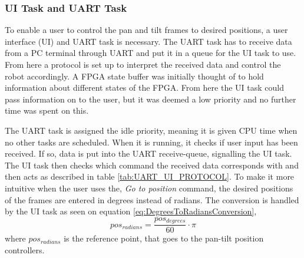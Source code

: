 \documentclass[../../main.tex]{subfiles}
\begin{document}





\subsubsection*{UI Task and UART Task}

To enable a user to control the pan and tilt frames to desired positions, a user interface (UI) and UART task is necessary. The UART task has to receive data from a PC terminal through UART and put it in a queue for the UI task to use. From here a protocol is set up to interpret the received data and control the robot accordingly. A FPGA state buffer was initially thought of to hold information about different states of the FPGA. From here the UI task could pass information on to the user, but it was deemed a low priority and no further time was spent on this.

The UART task is assigned the idle priority, meaning it is given CPU time when no other tasks are scheduled. When it is running, it checks if user input has been received. If so, data is put into the UART receive-queue, signalling the UI task. The UI task then checks which command the received data corresponds with and then acts as described in table \ref{tab:UART_UI_PROTOCOL}. To make it more intuitive when the user uses the, \textit{Go to position} command, the desired positions of the frames are entered in degrees instead of radians. The conversion is handled by the UI task as seen on equation \ref{eq:DegreesToRadiansConversion},
\begin{equation} \label{eq:DegreesToRadiansConversion}
    pos_{radians} = \frac{pos_{degrees}}{60}\cdot \pi
\end{equation}
where $pos_{radians}$ is the reference point, that goes to the pan-tilt position controllers.
\end{document}
